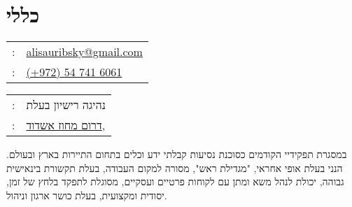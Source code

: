 \setRTL
\hspace{.25\textwidth}
\begin{minipage}[t]{.5\textwidth}
	\par{\par}
\end{minipage}

\section{כללי}
\label{sec:basicinfoheb}
\unsetRTL
\setLTR
\begin{minipage}[t]{.5\linewidth}
	\begin{tabular}{rp{.75\linewidth}}
		\baselineskip=20pt
		\email{} : &\href{mailto:alisauribsky@gmail.com}{alisauribsky@gmail.com}\\
		\phone{} : &\href{tel:972547416061}{(+972) 54 741 6061}
	\end{tabular}
\end{minipage}
\begin{minipage}[t]{.5\linewidth}
	\begin{tabular}{rl}
		\licence{} :  &נהיגה רישיון בעלת\\
		\location{} : &\href{https://goo.gl/maps/SaMTRU5cPT5GynTL8}{דרום מחוז אשדוד,}
	\end{tabular}
\end{minipage}	
\unsetLTR
\unsetRTL
\setRTL
\begin{minipage}[t]{1\linewidth}
	\vspace{0.25cm} %
במסגרת תפקידיי הקודמים כסוכנת נסיעות קבלתי ידע וכלים בתחום התיירות בארץ ובעולם. הנני בעלת אופי אחראי, "מגדילת ראש", מסורה למקום העבודה, בעלת תקשורת בינאישית גבוהה, יכולת לנהל משא ומתן עם לקוחות פרטיים ועסקיים, מסוגלת לתפקד בלחץ של זמן, יסודית ומקצועית, בעלת כושר ארגון וניהול. 
\end{minipage}

